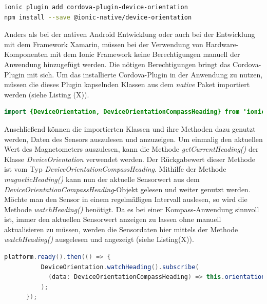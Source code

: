 \begin{lstlisting}[caption=Installation des Cordova-Plugins für das Magnetometer, label=lst:InstallationCordovaPlugin, language=bash]
ionic plugin add cordova-plugin-device-orientation
npm install --save @ionic-native/device-orientation
\end{lstlisting}

Anders als bei der nativen Android Entwicklung oder auch bei der Entwicklung mit dem Framework Xamarin, müssen bei der Verwendung von Hardware-Komponenten mit dem Ionic Framework keine Berechtigungen manuell der Anwendung hinzugefügt werden. Die nötigen Berechtigungen bringt das Cordova-Plugin mit sich. Um das installierte Cordova-Plugin in der Anwendung zu nutzen, müssen die dieses Plugin kapselnden Klassen aus dem \textit{native} Paket importiert werden (siehe Listing (X)). 

\begin{lstlisting}[caption=Import der Klassen für die Nutzung des Magnetometers aus dem  \textit{native} Paket von Ionic 2, label=lst:ImportDeviveOrientation, language=Java]
import {DeviceOrientation, DeviceOrientationCompassHeading} from 'ionic-native';
\end{lstlisting}

Anschließend können die importierten Klassen und ihre Methoden dazu genutzt werden, Daten des Sensors auszulesen und anzuzeigen. Um einmalig den aktuellen Wert des Magnetometers auszulesen, kann die Methode \textit{getCurrentHeading()} der Klasse \textit{DeviceOrientation} verwendet werden. Der Rückgabewert dieser Methode ist vom Typ \textit{DeviceOrientationCompassHeading}. Mithilfe der Methode \textit{magneticHeading()} kann nun der aktuelle Sensorwert aus dem \textit{DeviceOrientationCompassHeading}-Objekt gelesen und weiter genutzt werden. Möchte man den Sensor in einem regelmäßigen Intervall auslesen, so wird die Methode \textit{watchHeading()} benötigt. Da es bei einer Kompass-Anwendung sinnvoll ist, immer den aktuellen Sensorwert anzeigen zu lassen ohne manuell aktualisieren zu müssen, werden die Sensordaten hier mittels der Methode \textit{watchHeading()} ausgelesen und angezeigt (siehe Listing(X)). 

\begin{lstlisting}[caption=Auslesen der Daten des Magnetometers mithilfe der Methode \textit{watchHeading()}, label=lst:getDataDeviceOrientation, language=Java]
platform.ready().then(() => {
          DeviceOrientation.watchHeading().subscribe(
            (data: DeviceOrientationCompassHeading) => this.orientation2 = data.magneticHeading.toString()
          );
      });
\end{lstlisting}

